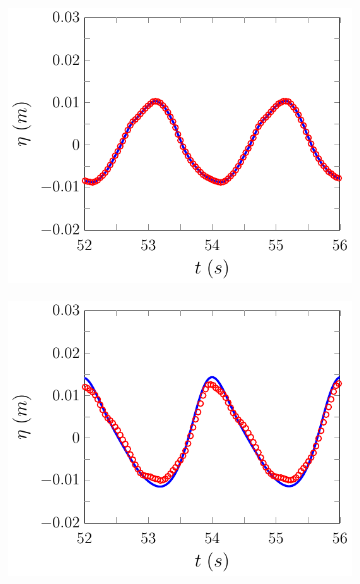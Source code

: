 \begin{figure}
	\centering
	\begin{subfigure}{0.5\textwidth}
		\includegraphics[width=\textwidth]{./chp6/figures/Experiment/Beji/sl/FEVMWG1.pdf}
		\vspace{0.5cm}
	\end{subfigure}%
	\begin{subfigure}{0.5\textwidth}
		\includegraphics[width=\textwidth]{./chp6/figures/Experiment/Beji/sl/FEVMWG2.pdf}
		\vspace{0.5cm}
	\end{subfigure}

\end{figure}
